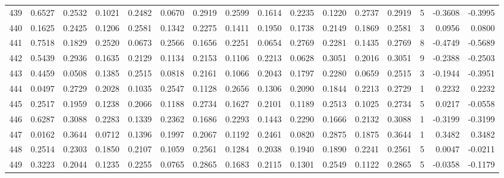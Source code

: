 \begin{tabular}{lrrrrrrrrrrrrrrr}
439 &      0.6527 &  0.2532 &  0.1021 &  0.2482 &  0.0670 &  0.2919 &  0.2599 &  0.1614 &  0.2235 &  0.1220 &   0.2737 &     0.2919 &      5 &                   -0.3608 &                    -0.3995 \\
440 &      0.1625 &  0.2425 &  0.1206 &  0.2581 &  0.1342 &  0.2275 &  0.1411 &  0.1950 &  0.1738 &  0.2149 &   0.1869 &     0.2581 &      3 &                    0.0956 &                     0.0800 \\
441 &      0.7518 &  0.1829 &  0.2520 &  0.0673 &  0.2566 &  0.1656 &  0.2251 &  0.0654 &  0.2769 &  0.2281 &   0.1435 &     0.2769 &      8 &                   -0.4749 &                    -0.5689 \\
442 &      0.5439 &  0.2936 &  0.1635 &  0.2129 &  0.1134 &  0.2153 &  0.1106 &  0.2213 &  0.0628 &  0.3051 &   0.2016 &     0.3051 &      9 &                   -0.2388 &                    -0.2503 \\
443 &      0.4459 &  0.0508 &  0.1385 &  0.2515 &  0.0818 &  0.2161 &  0.1066 &  0.2043 &  0.1797 &  0.2280 &   0.0659 &     0.2515 &      3 &                   -0.1944 &                    -0.3951 \\
444 &      0.0497 &  0.2729 &  0.2028 &  0.1035 &  0.2547 &  0.1128 &  0.2656 &  0.1306 &  0.2090 &  0.1844 &   0.2213 &     0.2729 &      1 &                    0.2232 &                     0.2232 \\
445 &      0.2517 &  0.1959 &  0.1238 &  0.2066 &  0.1188 &  0.2734 &  0.1627 &  0.2101 &  0.1189 &  0.2513 &   0.1025 &     0.2734 &      5 &                    0.0217 &                    -0.0558 \\
446 &      0.6287 &  0.3088 &  0.2283 &  0.1339 &  0.2362 &  0.1686 &  0.2293 &  0.1443 &  0.2290 &  0.1666 &   0.2132 &     0.3088 &      1 &                   -0.3199 &                    -0.3199 \\
447 &      0.0162 &  0.3644 &  0.0712 &  0.1396 &  0.1997 &  0.2067 &  0.1192 &  0.2461 &  0.0820 &  0.2875 &   0.1875 &     0.3644 &      1 &                    0.3482 &                     0.3482 \\
448 &      0.2514 &  0.2303 &  0.1850 &  0.2107 &  0.1059 &  0.2561 &  0.1284 &  0.2038 &  0.1940 &  0.1890 &   0.2241 &     0.2561 &      5 &                    0.0047 &                    -0.0211 \\
449 &      0.3223 &  0.2044 &  0.1235 &  0.2255 &  0.0765 &  0.2865 &  0.1683 &  0.2115 &  0.1301 &  0.2549 &   0.1122 &     0.2865 &      5 &                   -0.0358 &                    -0.1179 \\

\end{tabular}
